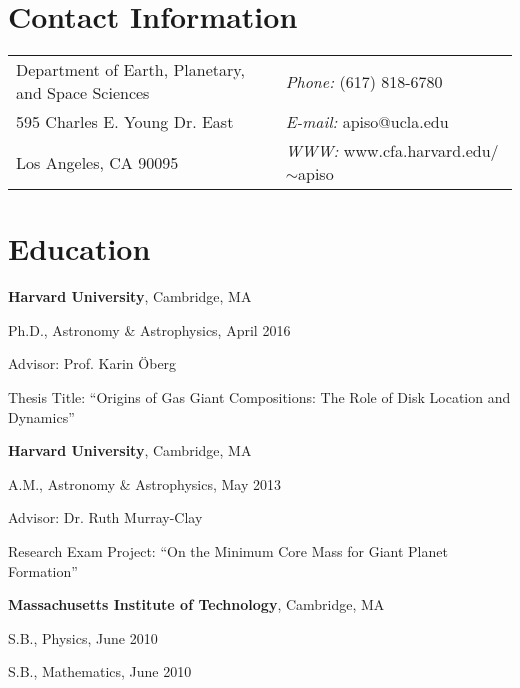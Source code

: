 \documentclass[margin,line]{res}
\newenvironment{list1}{
  \begin{list}{\ding{113}}{%
      \setlength{\itemsep}{0in}
      \setlength{\parsep}{0in} \setlength{\parskip}{0in}
      \setlength{\topsep}{0in} \setlength{\partopsep}{0in} 
      \setlength{\leftmargin}{0.17in}}}{\end{list}}
\begin{document}

\begin{resume}
\section{\sc Contact Information}
\vspace{.05in}
\begin{tabular}{@{}p{3.5in}p{4in}}
           
Department of Earth, Planetary, and Space Sciences & {\it Phone:}    (617) 818-6780 \\         
595 Charles E. Young Dr. East & {\it E-mail:}  apiso@ucla.edu\\       
Los Angeles, CA 90095  & {\it WWW:} www.cfa.harvard.edu/$\sim$apiso \\     
\end{tabular}



\section{\sc Education}
{\bf Harvard University}, Cambridge, MA \\
\begin{list1}
\vspace{-0.1in}
\item[] Ph.D., Astronomy \& Astrophysics, April 2016
\item[] Advisor: Prof. Karin \"Oberg 
\item[] Thesis Title: ``Origins of Gas Giant Compositions: The Role of Disk Location and Dynamics''   
\end{list1}
{\bf Harvard University}, Cambridge, MA \\
\begin{list1}
\vspace{-0.1in}
\item[] A.M., Astronomy \& Astrophysics, May 2013
\item[] Advisor: Dr. Ruth Murray-Clay
\item[] Research Exam Project: ``On the Minimum Core Mass for Giant Planet Formation''
\end{list1}
{\bf Massachusetts Institute of Technology}, Cambridge, MA\\
\vspace*{-.1in}
\begin{list1}
\item[] S.B., Physics,  June 2010 %
\item[] S.B., Mathematics, June 2010%
\end{list1}


\end{resume}
\end{document}
